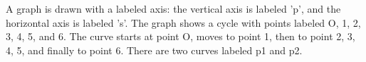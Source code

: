 A graph is drawn with a labeled axis: the vertical axis is labeled 'p', and the horizontal axis is labeled 's'. The graph shows a cycle with points labeled O, 1, 2, 3, 4, 5, and 6. The curve starts at point O, moves to point 1, then to point 2, 3, 4, 5, and finally to point 6. There are two curves labeled p1 and p2.
